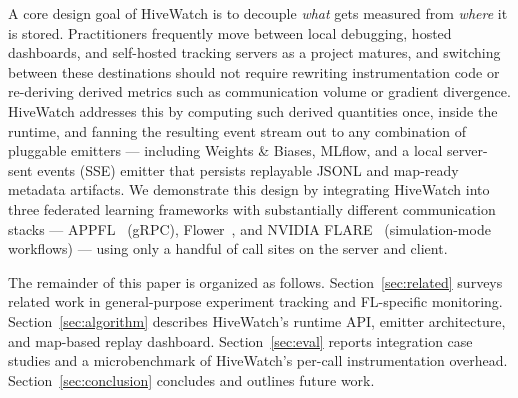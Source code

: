 A core design goal of HiveWatch is to decouple \emph{what} gets measured from \emph{where} it is stored. Practitioners frequently move between local debugging, hosted dashboards, and self-hosted tracking servers as a project matures, and switching between these destinations should not require rewriting instrumentation code or re-deriving derived metrics such as communication volume or gradient divergence. HiveWatch addresses this by computing such derived quantities once, inside the runtime, and fanning the resulting event stream out to any combination of pluggable emitters — including Weights \& Biases, MLflow, and a local server-sent events (SSE) emitter that persists replayable JSONL and map-ready metadata artifacts. We demonstrate this design by integrating HiveWatch into three federated learning frameworks with substantially different communication stacks — APPFL~\cite{ryu2022appfl, li2025advances} (gRPC), Flower~\cite{beutel2020flower}, and NVIDIA FLARE~\cite{roth2022nvidia} (simulation-mode workflows) — using only a handful of call sites on the server and client.

The remainder of this paper is organized as follows. Section~\ref{sec:related} surveys related work in general-purpose experiment tracking and FL-specific monitoring. Section~\ref{sec:algorithm} describes HiveWatch's runtime API, emitter architecture, and map-based replay dashboard. Section~\ref{sec:eval} reports integration case studies and a microbenchmark of HiveWatch's per-call instrumentation overhead. Section~\ref{sec:conclusion} concludes and outlines future work.




